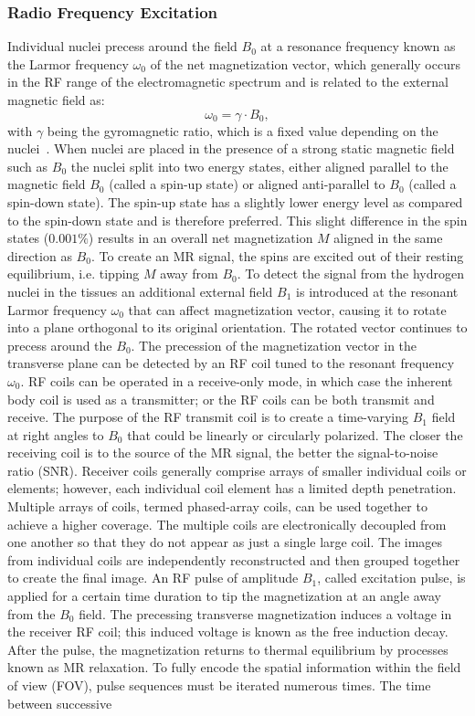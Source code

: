 \documentclass[english,version-2022-01]{uzl-thesis} %
\begin{document}
\subsubsection{Radio Frequency Excitation}
Individual nuclei precess around the field $B_0$ at a
resonance frequency known as the Larmor frequency $\omega_0$ of the net magnetization vector, which generally occurs in the RF range of the electromagnetic spectrum and is related to the external magnetic field as:
\begin{equation} \label{eq:LarmorFrequency}
	\omega_0 = \gamma \cdot B_0,
\end{equation}
with $\gamma$ being the gyromagnetic ratio, which is a fixed value depending on the nuclei~\cite{SamplingStrategies}. When nuclei are placed in the presence of a strong static magnetic field such as $B_0$ the nuclei split into two energy states, either aligned parallel to the magnetic field $B_0$ (called a spin-up state) or aligned anti-parallel to $B_0$ (called a spin-down state). The spin-up state has a slightly lower energy level as compared to the spin-down state and is therefore preferred. This slight difference in the spin states ($0.001\%$) results in an overall net magnetization $M$ aligned in the same direction as $B_0$. To create an MR signal, the spins are excited out of their resting equilibrium, i.e. tipping $M$ away from $B_0$. To detect the signal from the hydrogen nuclei in the tissues an additional external field $B_1$ is introduced at the resonant Larmor frequency $\omega_0$ that can affect magnetization vector, causing it to rotate into a plane orthogonal to its original orientation. The rotated vector continues to precess around the $B_0$. The precession of the magnetization vector in the transverse plane can be detected by an RF coil tuned to the resonant frequency $\omega_0$. RF coils can be operated in a receive-only mode, in which case the inherent body coil is used as a transmitter; or the RF coils can be both transmit and receive. The purpose of the RF transmit coil is to create a time-varying $B_1$ field at right angles to $B_0$ that could be linearly or circularly polarized. The closer the receiving coil is to the source of the MR signal, the better the signal-to-noise ratio (SNR). Receiver coils generally comprise arrays of smaller individual coils or elements; however, each individual coil element has a limited depth penetration. Multiple arrays of coils, termed phased-array coils, can be used together to achieve a higher coverage. The multiple coils are electronically decoupled from one another so that they do not appear as just a single large coil. The images from individual coils are independently reconstructed and then grouped together to create the final image. An RF pulse of amplitude $B_1$, called excitation pulse, is applied for a certain time duration to tip the magnetization at an angle away from the $B_0$ field. The precessing transverse magnetization induces a voltage in the receiver RF coil; this induced voltage is known as the free induction decay. After the pulse, the magnetization returns to thermal equilibrium by processes known as MR relaxation. To fully encode the spatial information within the field of view (FOV), pulse sequences must be iterated numerous times. The time between successive 
\end{document}

